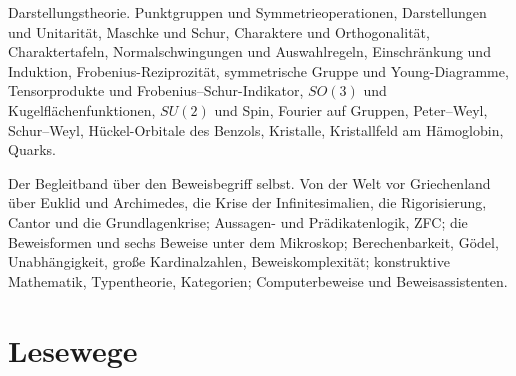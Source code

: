 \begin{merksatz}
Darstellungstheorie. Punktgruppen und Symmetrieoperationen, Darstellungen und Unitarität, Maschke und Schur, Charaktere und Orthogonalität, Charaktertafeln, Normalschwingungen und Auswahlregeln, Einschränkung und Induktion, Frobenius-Reziprozität, symmetrische Gruppe und Young-Diagramme, Tensorprodukte und Frobenius--Schur-Indikator, $SO(3)$ und Kugelflächenfunktionen, $SU(2)$ und Spin, Fourier auf Gruppen, Peter--Weyl, Schur--Weyl, Hückel-Orbitale des Benzols, Kristalle, Kristallfeld am Hämoglobin, Quarks.

\end{merksatz}

\begin{merksatz}
Der Begleitband über den Beweisbegriff selbst. Von der Welt vor Griechenland über Euklid und Archimedes, die Krise der Infinitesimalien, die Rigorisierung, Cantor und die Grundlagenkrise; Aussagen- und Prädikatenlogik, ZFC; die Beweisformen und sechs Beweise unter dem Mikroskop; Berechenbarkeit, Gödel, Unabhängigkeit, große Kardinalzahlen, Beweiskomplexität; konstruktive Mathematik, Typentheorie, Kategorien; Computerbeweise und Beweisassistenten.

\end{merksatz}

\section{Lesewege}

